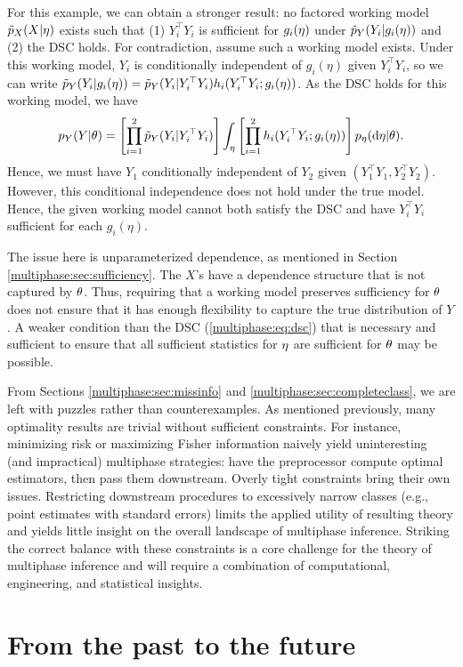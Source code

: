 For this example, we can obtain a stronger result: no factored working model $\tilde{p}_X(X |\eta)$ exists such that (1) $Y_i^\top Y_i$ is sufficient for $g_i(\eta)$ under $\tilde{p}_Y(Y_i | g_i(\eta))$ and (2) the DSC holds.
For contradiction, assume such a working model exists.
Under this working model, $Y_i$ is conditionally independent of $g_i(\eta)$ given $Y_i^\top Y_i$, so we can write $\tilde{p}_Y(Y_i | g_i(\eta)) = \tilde{p}_Y(Y_i | Y_i^\top Y_i) h_i(Y_i^\top Y_i; g_i(\eta))$.
As the DSC holds for this working model, we have
$$p_Y(Y | \theta) = \left[ \prod_{i=1}^2 \tilde{p}_Y(Y_i | Y_i^\top Y_i) \right] \int_{\eta} \left[ \prod_{i=1}^2 h_i(Y_i^\top Y_i; g_i(\eta)) \right] p_\eta(\mathrm{d}\eta | \theta) .
$$
Hence, we must have $Y_1$ conditionally independent of $Y_2$ given $(Y_1^\top Y_1, Y_2^\top Y_2)$.
However, this conditional independence does not hold under the true model.
Hence, the given working model cannot both satisfy the DSC and have $Y_i^\top Y_i$ sufficient for each $g_i(\eta)$. 

The issue here is unparameterized dependence, as mentioned in Section \ref{multiphase:sec:sufficiency}.
The $X$'s have a dependence structure that is not captured by $\theta$.
Thus, requiring that a working model preserves sufficiency for $\theta$ does not ensure that it has enough flexibility to capture the true distribution of $Y$.
A weaker condition than the DSC (\ref{multiphase:eq:dsc}) that is necessary and sufficient to ensure that all sufficient statistics for $\eta$ are sufficient for $\theta$ may be possible.

From Sections \ref{multiphase:sec:missinfo} and \ref{multiphase:sec:completeclass}, we are left with puzzles rather than counterexamples.
As mentioned previously, many optimality results are trivial without sufficient constraints.
For instance, minimizing risk or maximizing Fisher information naively yield uninteresting (and impractical) multiphase strategies: have the preprocessor compute optimal estimators, then pass them downstream.
Overly tight constraints bring their own issues.
Restricting downstream procedures to excessively narrow classes (e.g., point estimates with standard errors) limits the applied utility of resulting theory and yields little insight on the overall landscape of multiphase inference.
Striking the correct balance with these constraints is a core challenge for the theory of multiphase inference and will require a combination of computational, engineering, and statistical insights.

\section{From the past to the future }
\label{multiphase:sec:remarks}

